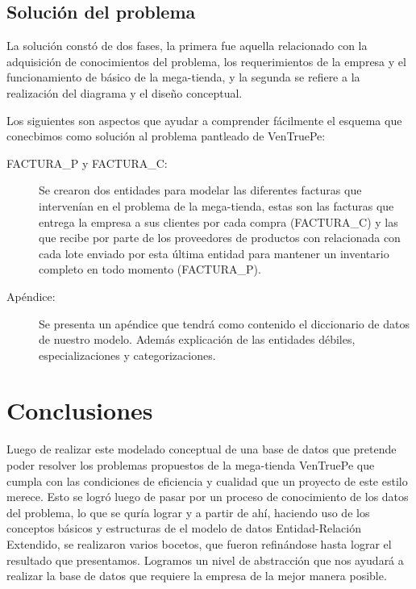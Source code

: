 \documentclass{article}
\begin{document}
\subsection{Soluci\'on del problema}

La soluci\'on const\'o de dos fases, la primera fue aquella relacionado con la adquisici\'on de conocimientos del problema, los requerimientos de la empresa y el funcionamiento de b\'asico de la mega-tienda, y la segunda se refiere a la realizaci\'on del diagrama y el dise\~no conceptual.

Los siguientes son aspectos que ayudar a comprender f\'acilmente el esquema que conecbimos como soluci\'on al problema pantleado de VenTruePe:


\begin{description}
\item[FACTURA\_P y FACTURA\_C:]
Se crearon dos entidades para modelar las diferentes facturas que interven\'ian en el problema de la mega-tienda, estas son las facturas que entrega la empresa a sus clientes por cada compra (FACTURA\_C) y las que recibe por parte de los proveedores de productos con relacionada con cada lote enviado por esta \'ultima entidad para mantener un inventario completo en todo momento (FACTURA\_P). \\

\item[Ap\'endice:]
Se presenta un ap\'endice que tendr\'a como contenido el diccionario de datos de nuestro modelo. Adem\'as explicaci\'on de las entidades d\'ebiles, especializaciones y categorizaciones.
\end{description} 
 

\section{Conclusiones}

Luego de realizar este modelado conceptual de una base de datos que pretende poder resolver los problemas propuestos de la mega-tienda VenTruePe que cumpla con las condiciones de eficiencia y cualidad que un proyecto de este estilo merece. Esto se logr\'o luego de pasar por un proceso de conocimiento de los datos del problema, lo que se qur\'ia lograr y a partir de ah\'i, haciendo uso de los conceptos b\'asicos y estructuras de el modelo de datos Entidad-Relaci\'on Extendido, se realizaron varios bocetos, que fueron refin\'andose hasta lograr el resultado que presentamos. Logramos un nivel de abstracci\'on que nos ayudar\'a a realizar la base de datos que requiere la empresa de la mejor manera posible.
\clearpage
\end{document}
